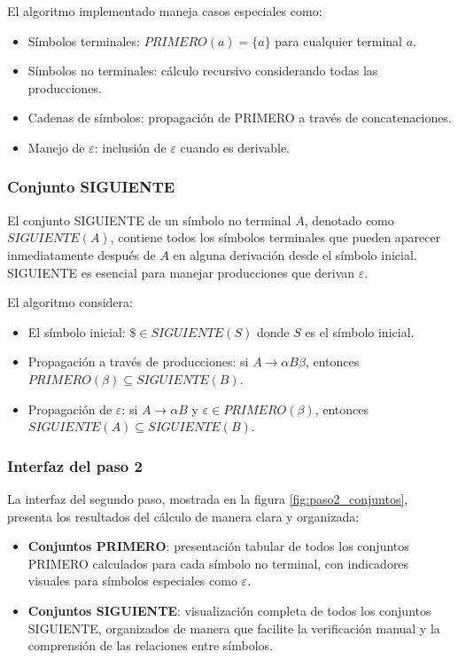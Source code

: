 El algoritmo implementado maneja casos especiales como:
\begin{itemize}
    \item Símbolos terminales: $PRIMERO(a) = \{a\}$ para cualquier terminal $a$.
    \item Símbolos no terminales: cálculo recursivo considerando todas las producciones.
    \item Cadenas de símbolos: propagación de PRIMERO a través de concatenaciones.
    \item Manejo de $\varepsilon$: inclusión de $\varepsilon$ cuando es derivable.
\end{itemize}

\subsubsection{Conjunto SIGUIENTE}

El conjunto SIGUIENTE de un símbolo no terminal $A$, denotado como $SIGUIENTE(A)$, contiene todos los símbolos terminales que pueden aparecer inmediatamente después de $A$ en alguna derivación desde el símbolo inicial. SIGUIENTE es esencial para manejar producciones que derivan $\varepsilon$.

El algoritmo considera:
\begin{itemize}
    \item El símbolo inicial: $\$ \in SIGUIENTE(S)$ donde $S$ es el símbolo inicial.
    \item Propagación a través de producciones: si $A \rightarrow \alpha B \beta$, entonces $PRIMERO(\beta) \subseteq SIGUIENTE(B)$.
    \item Propagación de $\varepsilon$: si $A \rightarrow \alpha B$ y $\varepsilon \in PRIMERO(\beta)$, entonces $SIGUIENTE(A) \subseteq SIGUIENTE(B)$.
\end{itemize}

\subsubsection{Interfaz del paso 2}

La interfaz del segundo paso, mostrada en la figura \ref{fig:paso2_conjuntos}, presenta los resultados del cálculo de manera clara y organizada:

\begin{itemize}
    \item \textbf{Conjuntos PRIMERO}: presentación tabular de todos los conjuntos PRIMERO calculados para cada símbolo no terminal, con indicadores visuales para símbolos especiales como $\varepsilon$.
    \item \textbf{Conjuntos SIGUIENTE}: visualización completa de todos los conjuntos SIGUIENTE, organizados de manera que facilite la verificación manual y la comprensión de las relaciones entre símbolos.
\end{itemize}


